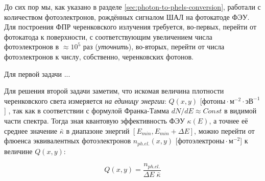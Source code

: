До сих пор мы, как указано в разделе \ref{sec:photon-to-phels-conversion}, работали с количеством фотоэлектронов, рождённых сигналом ШАЛ на фотокатоде ФЭУ. Для построения ФПР черенковского излучения требуется, во-первых, перейти от фотокатода к поверхности, с соответствующим увеличением числа фотоэлектронов в $\approx 10^5$ раз (\textit{уточнить}), во-вторых, перейти от числа фотоэлектронов к числу, собственно, черенковских фотонов.

Для первой задачи ...

Для решения второй задачи заметим, что искомая величина плотности черенковского света измеряется \textit{на единицу энергии}: $Q(x, y)$ [$\text{фотоны} \cdot \text{м}^{-2} \cdot \text{эВ}^{-1}$] \cite{Budnev2005}, так как в соответствии с формулой Франка-Тамма \cite{Tamm1939} $dN/dE \approx Const$ в видимой части спектра. Тогда зная квантовую эффективность ФЭУ $\kappa(E)$, а точнее её среднее значение $\bar{\kappa}$ в диапазоне энергий $[E_{min}, E_{min} + \Delta E]$, можно перейти от флюенса эквивалентных фотоэлектронов $n_{ph. el.} (x, y)$ [$\text{фотоэлектроны} \cdot \text{м}^{-2}$] к величине $Q(x, y)$:

\begin{equation}
	Q(x, y) = \frac{n_{ph. el.}}{\Delta E \; \bar{\kappa}}
\end{equation}

